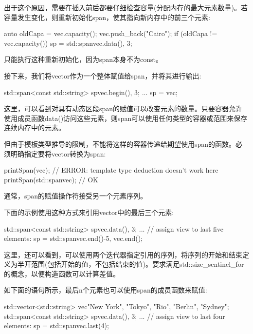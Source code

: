 出于这个原因，需要在插入前后都要仔细检查容量(分配内存的最大元素数量)。若容量发生变化，则重新初始化span，使其指向新内存中的前三个元素:

\begin{cpp}
auto oldCapa = vec.capacity();
vec.push_back("Cairo");
if (oldCapa != vec.capacity()) {
	sp = std::span{vec.data(), 3};
}
\end{cpp}

只能执行这种重新初始化，因为span本身不为const。


接下来，我们将vector作为一个整体赋值给span，并将其进行输出:

\begin{cpp}
std::span<const std::string> sp{vec.begin(), 3};
...
sp = vec;
\end{cpp}

这里，可以看到对具有动态区段span的赋值可以改变元素的数量。只要容器允许使用成员函数data()访问这些元素，则span可以使用任何类型的容器或范围来保存连续内存中的元素。

但由于模板类型推导的限制，不能将这样的容器传递给期望使用span的函数。必须明确指定要将vector转换为span:

\begin{cpp}
printSpan(vec); // ERROR: template type deduction doesn’t work here
printSpan(std::span{vec}); // OK
\end{cpp}


通常，span的赋值操作符接受另一个元素序列。

下面的示例使用这种方式来引用vector中的最后三个元素:

\begin{cpp}
std::span<const std::string> sp{vec.data(), 3};
...
// assign view to last five elements:
sp = std::span{vec.end()-5, vec.end()};
\end{cpp}

这里，还可以看到，可以使用两个迭代器指定引用的序列，将序列的开始和结束定义为半开范围(包括开始的值，不包括结束的值)。要求满足std::size\_sentinel\_for的概念，以便构造函数可以计算差值。

如下面的语句所示，最后n个元素也可以使用span的成员函数来赋值:

\begin{cpp}
std::vector<std::string> vec{"New York", "Tokyo", "Rio", "Berlin", "Sydney"};
std::span<const std::string> sp{vec.data(), 3};
...
// assign view to last four elements:
sp = std::span{vec}.last(4);
\end{cpp}


